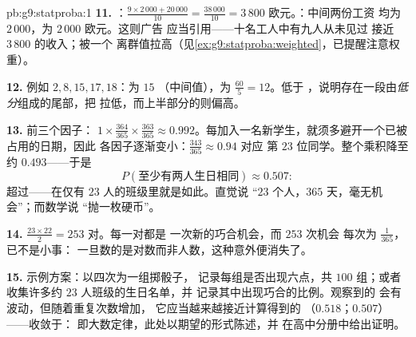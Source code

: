 \begin{solution}{pb:g9:statproba:1}
\textbf{11.} ：$\frac{9 \times 2\,000 + 20\,000}{10} =
\frac{38\,000}{10} = 3\,800$ 欧元。：中间两份工资
均为 $2\,000$，为 $2\,000$ 欧元。这则广告
应当引用——十名工人中有九人从未见过
接近 $3\,800$ 的收入；被一个
离群值拉高（见\cref{ex:g9:statproba:weighted}，已提醒注意权重）。

\textbf{12.} 例如 $2, 8, 15, 17, 18$：为 $15$
（中间值），为 $\frac{60}{5} = 12$。低于
，说明存在一段由\emph{低分}组成的尾部，把
拉低，而上半部分的则偏高。

\textbf{13.} 前三个因子：
$1 \times \frac{364}{365} \times \frac{363}{365} \approx
0.992$。每加入一名新学生，就须多避开一个已被占用的日期，因此
各因子逐渐变小：$\frac{343}{365} \approx 0.94$ 对应
第 $23$ 位同学。整个乘积降至约 $0.493$——于是
\[
P(\text{至少有两人生日相同}) \approx 0.507 :
\]
超过——在仅有 $23$ 人的班级里就是如此。直觉说
“$23$ 个人，$365$ 天，毫无机会”；而数学说
“抛一枚硬币”。

\textbf{14.} $\frac{23 \times 22}{2} = 253$ 对。每一对都是
一次新的巧合机会，而 $253$ 次机会
每次为 $\frac{1}{365}$，已不是小事：
一旦数的是对数而非人数，这种意外便消失了。

\textbf{15.} 示例方案：以四次为一组掷骰子，
记录每组是否出现六点，共 $100$ 组；或者
收集许多约 $23$ 人班级的生日名单，并
记录其中出现巧合的比例。观察到的
会有波动，但随着重复次数增加，
它应当越来越接近计算得到的
（$0.518$；$0.507$）——收敛于：
即大数定律，此处以期望的形式陈述，并
在高中分册中给出证明。
\end{solution}
